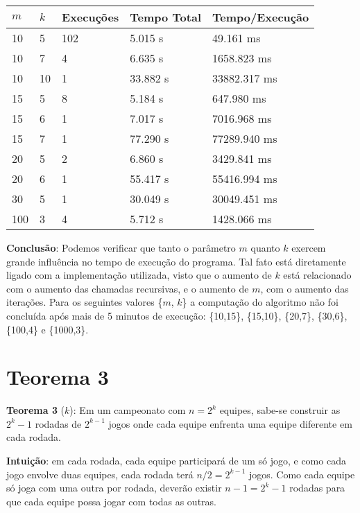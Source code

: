 \documentclass{article}
\begin{document}
\begin{table}[H]
\centering
\begin{tabular}{l|l|l|l|l}
$m$ & $k$ & Execuções & Tempo Total & Tempo/Execução \\\hline
10 & 5 & 102 & 5.015 s & 49.161 ms \\
10 & 7 & 4 & 6.635 s & 1658.823 ms \\
10 & 10 & 1 & 33.882 s & 33882.317 ms \\
15 & 5 & 8 & 5.184 s & 647.980 ms \\
15 & 6 & 1 & 7.017 s & 7016.968 ms \\
15 & 7 & 1 & 77.290 s & 77289.940 ms \\
20 & 5 & 2 & 6.860 s & 3429.841 ms \\
20 & 6 & 1 & 55.417 s & 55416.994 ms \\
30 & 5 & 1 & 30.049 s & 30049.451 ms \\
100 & 3 & 4 & 5.712 s & 1428.066 ms \\



\end{tabular}
\end{table}

\textbf{Conclusão}: Podemos verificar que tanto o parâmetro $m$ quanto $k$ exercem grande influência no tempo de execução do programa. Tal fato está diretamente ligado com a implementação utilizada, visto que o aumento de $k$ está relacionado com o aumento das chamadas recursivas, e o aumento de $m$, com o aumento das iterações. Para os seguintes valores \{$m$, $k$\} a computação do algoritmo não foi concluída após mais de 5 minutos de execução: \{10,15\}, \{15,10\}, \{20,7\}, \{30,6\}, \{100,4\} e \{1000,3\}.

\section{Teorema 3}

\textbf{Teorema 3} ($k$): Em um campeonato com $n = 2^k$ equipes, sabe-se construir as $2^k - 1$ rodadas de $2^{k - 1}$ jogos onde cada equipe enfrenta uma equipe diferente em cada rodada.

\textbf{Intuição}: em cada rodada, cada equipe participará de um só jogo, e como cada jogo envolve duas equipes, cada rodada terá $n/2 = 2^{k-1}$ jogos. Como cada equipe só joga com uma outra por rodada, deverão existir $n-1 = 2^k -1$ rodadas para que cada equipe possa jogar com todas as outras.
\end{document}
